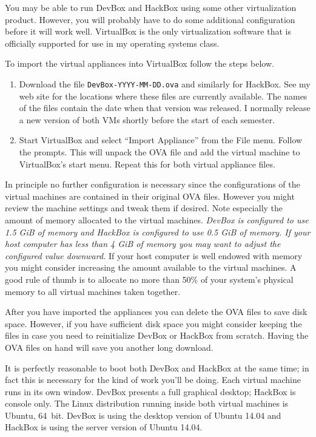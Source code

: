 \documentclass[twocolumn]{article}
\begin{document}
You may be able to run DevBox and HackBox using some other virtualization product. However, you
will probably have to do some additional configuration before it will work well. VirtualBox is
the only virtualization software that is officially supported for use in my operating systems
class.

To import the virtual appliances into VirtualBox follow the steps below.

\begin{enumerate}

\item Download the file \texttt{DevBox-YYYY-MM-DD.ova} and similarly for HackBox. See my web
  site for the locations where these files are currently available. The names of the files
  contain the date when that version was released. I normally release a new version of both VMs
  shortly before the start of each semester.

\item Start VirtualBox and select ``Import Appliance'' from the File menu. Follow the prompts.
  This will unpack the OVA file and add the virtual machine to VirtualBox's start menu. Repeat
  this for both virtual appliance files.

\end{enumerate}

In principle no further configuration is necessary since the configurations of the virtual
machines are contained in their original OVA files. However you might review the machine
settings and tweak them if desired. Note especially the amount of memory allocated to the
virtual machines. \emph{DevBox is configured to use 1.5 GiB of memory and HackBox is configured
  to use 0.5 GiB of memory. If your host computer has less than 4 GiB of memory you may want to
  adjust the configured value downward.} If your host computer is well endowed with memory you
might consider increasing the amount available to the virtual machines. A good rule of thumb is
to allocate no more than 50\% of your system's physical memory to all virtual machines taken
together.

After you have imported the appliances you can delete the OVA files to save disk space. However,
if you have sufficient disk space you might consider keeping the files in case you need to
reinitialize DevBox or HackBox from scratch. Having the OVA files on hand will save you another
long download.

It is perfectly reasonable to boot both DevBox and HackBox at the same time; in fact this is
necessary for the kind of work you'll be doing. Each virtual machine runs in its own window.
DevBox presents a full graphical desktop; HackBox is console only. The Linux distribution
running inside both virtual machines is Ubuntu, 64~bit. DevBox is using the desktop version of
Ubuntu 14.04 and HackBox is using the server version of Ubuntu 14.04.
\end{document}
